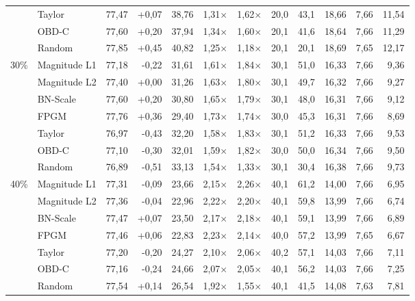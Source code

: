 \begin{table}[H]
{{\begin{tabular}{c l rr rrr rr rrr}
     & Taylor & 77,47 & +0,07 & 38,76 & 1,31$\times$ & 1,62$\times$ & 20,0 & 43,1 & 18,66 & 7,66 & 11,54 \\
     & OBD-C & 77,60 & +0,20 & 37,94 & 1,34$\times$ & 1,60$\times$ & 20,1 & 41,6 & 18,64 & 7,66 & 11,29 \\
     & Random & 77,85 & +0,45 & 40,82 & 1,25$\times$ & 1,18$\times$ & 20,1 & 20,1 & 18,69 & 7,65 & 12,17 \\
    \midrule
    \multirow{7}{*}{30\%} & Magnitude L1 & 77,18 & -0,22 & 31,61 & 1,61$\times$ & 1,84$\times$ & 30,1 & 51,0 & 16,33 & 7,66 & 9,36 \\
     & Magnitude L2 & 77,40 & +0,00 & 31,26 & 1,63$\times$ & 1,80$\times$ & 30,1 & 49,7 & 16,32 & 7,66 & 9,27 \\
     & BN-Scale & 77,60 & +0,20 & 30,80 & 1,65$\times$ & 1,79$\times$ & 30,1 & 48,0 & 16,31 & 7,66 & 9,12 \\
     & FPGM & 77,76 & +0,36 & 29,40 & 1,73$\times$ & 1,74$\times$ & 30,0 & 45,3 & 16,31 & 7,66 & 8,69 \\
     & Taylor & 76,97 & -0,43 & 32,20 & 1,58$\times$ & 1,83$\times$ & 30,1 & 51,2 & 16,33 & 7,66 & 9,53 \\
     & OBD-C & 77,10 & -0,30 & 32,01 & 1,59$\times$ & 1,82$\times$ & 30,0 & 50,0 & 16,34 & 7,66 & 9,50 \\
     & Random & 76,89 & -0,51 & 33,13 & 1,54$\times$ & 1,33$\times$ & 30,1 & 30,4 & 16,38 & 7,66 & 9,73 \\
    \midrule
    \multirow{7}{*}{40\%} & Magnitude L1 & 77,31 & -0,09 & 23,66 & 2,15$\times$ & 2,26$\times$ & 40,1 & 61,2 & 14,00 & 7,66 & 6,95 \\
     & Magnitude L2 & 77,36 & -0,04 & 22,96 & 2,22$\times$ & 2,20$\times$ & 40,1 & 59,8 & 13,99 & 7,66 & 6,74 \\
     & BN-Scale & 77,47 & +0,07 & 23,50 & 2,17$\times$ & 2,18$\times$ & 40,1 & 59,1 & 13,99 & 7,66 & 6,89 \\
     & FPGM & 77,46 & +0,06 & 22,83 & 2,23$\times$ & 2,14$\times$ & 40,0 & 57,2 & 13,99 & 7,65 & 6,67 \\
     & Taylor & 77,20 & -0,20 & 24,27 & 2,10$\times$ & 2,06$\times$ & 40,2 & 57,1 & 14,03 & 7,66 & 7,11 \\
     & OBD-C & 77,16 & -0,24 & 24,66 & 2,07$\times$ & 2,05$\times$ & 40,1 & 56,2 & 14,03 & 7,66 & 7,25 \\
     & Random & 77,54 & +0,14 & 26,54 & 1,92$\times$ & 1,55$\times$ & 40,1 & 41,5 & 14,08 & 7,63 & 7,81 \\
    \midrule

\end{tabular}}}
\end{table}

